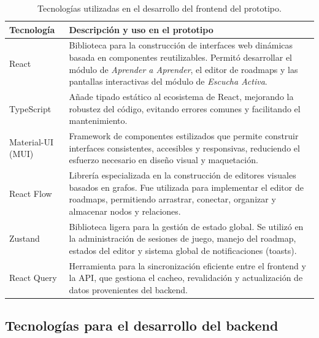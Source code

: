 \begin{table}[H]
\centering
\footnotesize
\begin{tabular}{| m{3.5cm} | m{11cm} |}
\hline
\textbf{Tecnología} & \textbf{Descripción y uso en el prototipo} \\
\hline
React & Biblioteca para la construcción de interfaces web dinámicas basada en componentes reutilizables. Permitó desarrollar el módulo de \textit{Aprender a Aprender}, el editor de roadmaps y las pantallas interactivas del módulo de \textit{Escucha Activa}. \\
\hline
TypeScript & Añade tipado estático al ecosistema de React, mejorando la robustez del código, evitando errores comunes y facilitando el mantenimiento. \\
\hline
Material-UI (MUI) & Framework de componentes estilizados que permite construir interfaces consistentes, accesibles y responsivas, reduciendo el esfuerzo necesario en diseño visual y maquetación. \\
\hline
React Flow & Librería especializada en la construcción de editores visuales basados en grafos. Fue utilizada para implementar el editor de roadmaps, permitiendo arrastrar, conectar, organizar y almacenar nodos y relaciones. \\
\hline
Zustand & Biblioteca ligera para la gestión de estado global. Se utilizó en la administración de sesiones de juego, manejo del roadmap, estados del editor y sistema global de notificaciones (toasts). \\
\hline
React Query & Herramienta para la sincronización eficiente entre el frontend y la API, que gestiona el cacheo, revalidación y actualización de datos provenientes del backend. \\
\hline
\end{tabular}
\caption{Tecnologías utilizadas en el desarrollo del frontend del prototipo.}
\end{table}

\subsection{Tecnologías para el desarrollo del backend}

